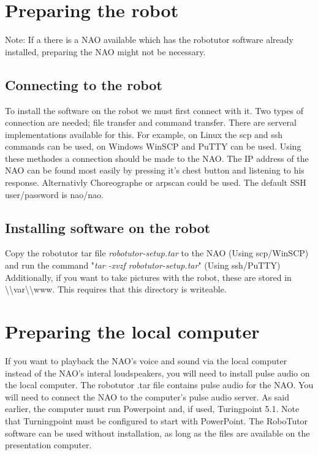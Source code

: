 
\section{Preparing the robot}
Note: If a there is a NAO available which has the robotutor software already installed, preparing the NAO might not be necessary.

\subsection{Connecting to the robot}
To install the software on the robot we must first connect with it. Two types of connection are needed; file transfer and command transfer. There are serveral implementations available for this. For example, on Linux the scp and ssh commands can be used, on Windows WinSCP and PuTTY can be used. Using these methodes a connection should be made to the NAO. The IP address of the NAO can be found most easily by pressing it's chest button and listening to his response. Alternativly Choreographe or arpscan could be used. The default SSH user/password is nao/nao. 

\subsection{Installing software on the robot}

Copy the robotutor tar file \emph{robotutor-setup.tar} to the NAO  (Using scp/WinSCP) and run the command "\emph{tar -xvzf robotutor-setup.tar}" (Using ssh/PuTTY)
Additionally, if you want to take pictures with the robot, these are stored in \textbackslash\textbackslash var\textbackslash\textbackslash www. This requires that this directory is writeable.

\section{Preparing the local computer}
If you want to playback the NAO's voice and sound via the local computer instead of the NAO's interal loudspeakers, you will need to install pulse audio on the local computer. The robotutor .tar file contains pulse audio for the NAO. You will need to connect the NAO to the computer's pulse audio server. As said earlier, the computer must run Powerpoint and, if used, Turingpoint 5.1. Note that Turningpoint must be configured to start with PowerPoint. The  RoboTutor software can be used without installation, as long as the files are available on the presentation computer.

